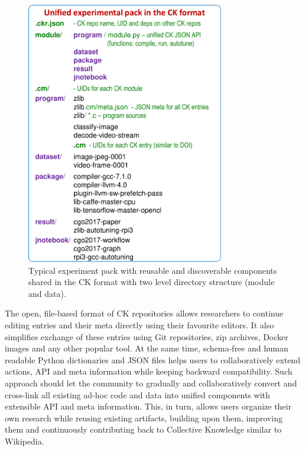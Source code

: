    \begin{figure}[htbp]
     \centering
      \includegraphics[width=3.4in]
      {ck-assets/57ab625c176c52ad-cropped.pdf} %
     \caption{
        Typical experiment pack with reusable and discoverable components 
        shared in the CK format with two level directory structure (module and data).
     }
     \label{fig:ck-repo}
   \end{figure}

The open, file-based format of CK repositories allows researchers
to continue editing entries and their meta directly using their favourite editors.
%
It also simplifies exchange of these entries using Git repositories, zip archives, Docker images 
and any other popular tool.
%
At the same time, schema-free and human readable Python dictionaries
and JSON files helps users to collaboratively extend actions, API and meta information
while keeping backward compatibility.
%
Such approach should let the community to gradually and collaboratively convert and
cross-link all existing ad-hoc code and data into unified components
with extensible API and meta information.
%
This, in turn, allows users organize their own research while reusing existing artifacts,
building upon them, improving them and continuously contributing back to Collective Knowledge
similar to Wikipedia.

